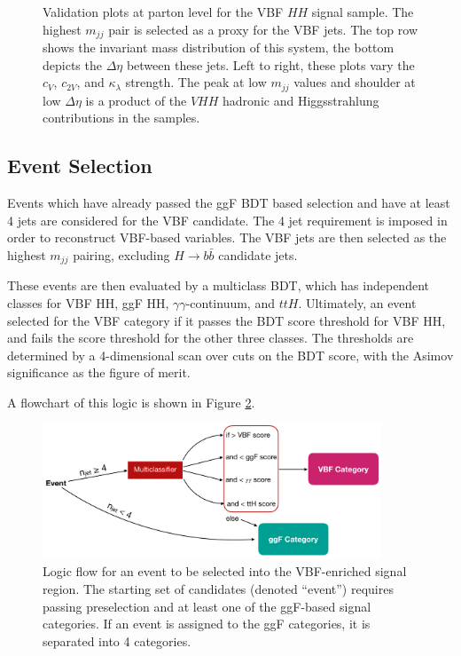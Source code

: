 \begin{figure}[htbp]
    \caption{Validation plots at parton level for the VBF $HH$ signal sample. The highest $m_{jj}$ pair is selected as a proxy for the VBF jets. The top row shows the invariant mass distribution of this system, the bottom depicts the $\Delta \eta$ between these jets. Left to right, these plots vary the $c_V$, $c_{2V}$, and $\kappa_\lambda$ strength. The peak at low $m_{jj}$ values and shoulder at low $\Delta \eta$ is a product of the $VHH$ hadronic and Higgsstrahlung contributions in the samples.}
    \label{fig:vbf-mc-validation}
\end{figure}

\subsection{Event Selection} \label{ssec:vbf-event-selection}
Events which have already passed the ggF BDT based selection and have at least 4 jets are considered for the VBF candidate. The 4 jet requirement is imposed in order to reconstruct VBF-based variables. The VBF jets are then selected as the highest $m_{jj}$ pairing, excluding $H\rightarrow b\bar{b}$ candidate jets.

These events are then evaluated by a multiclass BDT, which has independent classes for VBF HH, ggF HH, $\gamma \gamma$-continuum, and $ttH$. Ultimately, an event selected for the VBF category if it passes the BDT score threshold for VBF HH, and fails the score threshold for the other three classes. The thresholds are determined by a 4-dimensional scan over cuts on the BDT score, with the Asimov significance as the figure of merit.

A flowchart of this logic is shown in Figure \ref{fig:vbf-logic}.

\begin{figure}[htbp]
    \centering
	\includegraphics[width=0.9\textwidth]{chapters/chapter5_yybb/images/vbf_logic.png}
    \caption{Logic flow for an event to be selected into the VBF-enriched signal region. The starting set of candidates (denoted ``event'') requires passing preselection and at least one of the ggF-based signal categories. If an event is assigned to the ggF categories, it is separated into 4 categories.}
    \label{fig:vbf-logic}
\end{figure}


